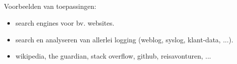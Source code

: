 


\subsection{}
\begin{styleframe}
	\frametitle{}
Voorbeelden van toepassingen:
\begin{itemize}[<+>]
	\item search engines voor bv. websites.
	\item search en analyseren van allerlei logging (weblog, syslog, klant-data, ...).
	\item wikipedia, the guardian, stack overflow, github, reisavonturen, ...
\end{itemize}
\end{styleframe}


